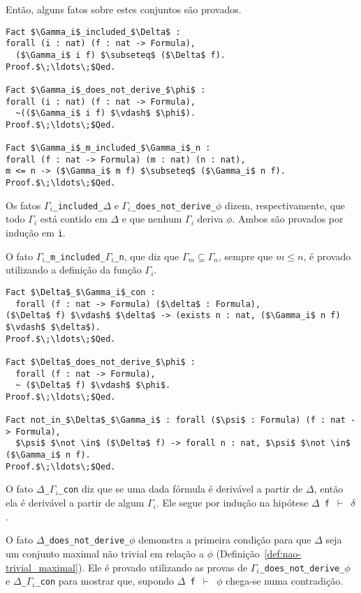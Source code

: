         Então, alguns fatos sobre estes conjuntos são provados.

        \begin{lstlisting}[name=Completeness, frame=single, language=coq]
Fact $\Gamma_i$_included_$\Delta$ : 
forall (i : nat) (f : nat -> Formula),
  ($\Gamma_i$ i f) $\subseteq$ ($\Delta$ f).
Proof.$\;\ldots\;$Qed.

Fact $\Gamma_i$_does_not_derive_$\phi$ :
forall (i : nat) (f : nat -> Formula),
  ~(($\Gamma_i$ i f) $\vdash$ $\phi$).
Proof.$\;\ldots\;$Qed.

Fact $\Gamma_i$_m_included_$\Gamma_i$_n : 
forall (f : nat -> Formula) (m : nat) (n : nat), 
m <= n -> ($\Gamma_i$ m f) $\subseteq$ ($\Gamma_i$ n f).
Proof.$\;\ldots\;$Qed.
        \end{lstlisting}

        Os fatos \texttt{$\Gamma_i$\_included\_$\Delta$} e \texttt{$\Gamma_i$\_does\_not\_derive\_$\phi$} dizem, respectivamente, que todo $\Gamma_i$ está contido em $\Delta$ e que nenhum $\Gamma_i$ deriva $\phi$. Ambos são provados por indução em \texttt{i}. 
        
        O fato \texttt{$\Gamma_i$\_m\_included\_$\Gamma_i$\_n}, que diz que $\Gamma_m \subseteq \Gamma_n$, sempre que $m \leq n$, é provado utilizando a definição da função \texttt{$\Gamma_i$}.

        \begin{lstlisting}[name=Completeness, frame=single, language=coq]
Fact $\Delta$_$\Gamma_i$_con :
  forall (f : nat -> Formula) ($\delta$ : Formula), 
($\Delta$ f) $\vdash$ $\delta$ -> (exists n : nat, ($\Gamma_i$ n f) $\vdash$ $\delta$).
Proof.$\;\ldots\;$Qed.

Fact $\Delta$_does_not_derive_$\phi$ : 
  forall (f : nat -> Formula), 
  ~ ($\Delta$ f) $\vdash$ $\phi$.
Proof.$\;\ldots\;$Qed.

Fact not_in_$\Delta$_$\Gamma_i$ : forall ($\psi$ : Formula) (f : nat -> Formula),
  $\psi$ $\not \in$ ($\Delta$ f) -> forall n : nat, $\psi$ $\not \in$ ($\Gamma_i$ n f).
Proof.$\;\ldots\;$Qed.
        \end{lstlisting}
        
        O fato \texttt{$\Delta$\_$\Gamma_i$\_con} diz que se uma dada fórmula é derivável a partir de $\Delta$, então ela é derivável a partir de algum $\Gamma_i$. Ele segue por indução na hipótese \texttt{$\Delta$ f $\vdash$ $\delta$}. 
        
        O fato \texttt{$\Delta$\_does\_not\_derive\_$\phi$} demonstra a primeira condição para que $\Delta$ seja um conjunto maximal não trivial em relação a $\phi$ (Definição~\ref{def:nao-trivial_maximal}). Ele é provado utilizando as provas de \texttt{$\Gamma_i$\_does\_not\_derive\_$\phi$} e \texttt{$\Delta$\_$\Gamma_i$\_con} para mostrar que, supondo \texttt{$\Delta$ f $\vdash$ $\phi$} chega-se numa contradição. 
        
